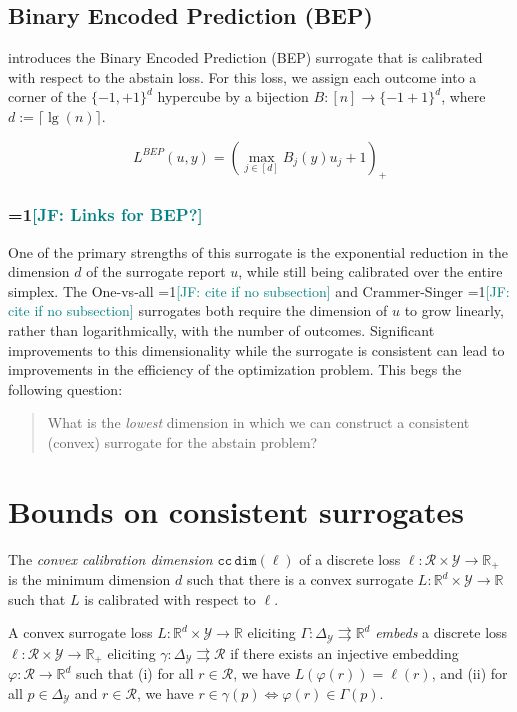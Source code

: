 \documentclass[anon,12pt]{colt2021} %
\newcommand{\Comments}{1}
\newcommand{\mynote}[2]{\ifnum\Comments=1\textcolor{#1}{#2}\fi}
\newcommand{\jessie}[1]{\mynote{teal}{[JF: #1]}}
\newcommand{\reals}{\mathbb{R}}
\newcommand{\simplex}{\Delta_\Y}
\newcommand{\ccdim}{\mathtt{cc\,dim}}
\newcommand{\R}{\mathcal{R}}
\newcommand{\Y}{\mathcal{Y}}
\newcommand{\toto}{\rightrightarrows}
\begin{document}
\subsection{Binary Encoded Prediction (BEP)}
\cite{ramaswamy2018consistent} introduces the Binary Encoded Prediction (BEP) surrogate that is calibrated with respect to the abstain loss.
For this loss, we assign each outcome into a corner of the $\{-1, +1\}^d$ hypercube by a bijection $B : [n] \to \{-1+1\}^d$, where $d := \lceil \lg(n) \rceil$.

\begin{equation}
L^{BEP}(u,y) = \left( \max_{j \in [d]} B_j(y) u_j + 1 \right)_+ \tag*{BEP} 
\end{equation}

\subsubsection{\jessie{Links for BEP?}}

One of the primary strengths of this surrogate is the exponential reduction in the dimension $d$ of the surrogate report $u$, while still being calibrated over the entire simplex.
The One-vs-all \jessie{cite if no subsection} and Crammer-Singer \jessie{cite if no subsection} surrogates both require the dimension of $u$ to grow linearly, rather than logarithmically, with the number of outcomes.
Significant improvements to this dimensionality while the surrogate is consistent can lead to improvements in the efficiency of the optimization problem.
This begs the following question: 
\begin{quote}
	What is the \emph{lowest} dimension in which we can construct a consistent (convex) surrogate for the abstain problem?
\end{quote}

\section{Bounds on consistent surrogates}
\begin{definition}
	The \emph{convex calibration dimension} $\ccdim(\ell)$ of a discrete loss $\ell : \R \times \Y \to \reals_+$ is the minimum dimension $d$ such that there is a convex surrogate $L : \reals^d \times \Y \to \reals$ such that $L$ is calibrated with respect to $\ell$.
\end{definition}

\begin{definition}[Embeds]
	A convex surrogate loss $L : \reals^d \times \Y \to \reals$ eliciting $\Gamma: \simplex \toto \reals^d$ \emph{embeds} a discrete loss $\ell : \R \times \Y \to \reals_+$ eliciting $\gamma : \simplex \toto \R$ if there exists an injective embedding $\varphi : \R \to \reals^d$ such that (i) for all $r \in \R$, we have $L(\varphi(r)) = \ell(r)$, and (ii) for all $p \in \simplex$ and $r \in \R$, we have $r \in \gamma(p) \iff \varphi(r) \in \Gamma(p)$.
\end{definition}
\end{document}
